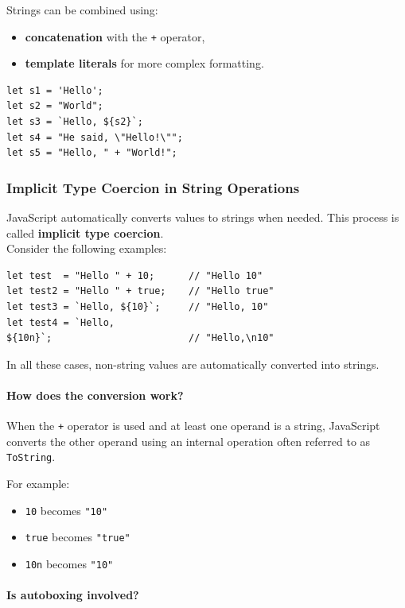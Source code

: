\documentclass{scrbook}
\begin{document}
Strings can be combined using:
\begin{itemize}
    \item \textbf{concatenation} with the \texttt{+} operator,
    \item \textbf{template literals} for more complex formatting.
\end{itemize}

\begin{lstlisting}
let s1 = 'Hello';
let s2 = "World";
let s3 = `Hello, ${s2}`;
let s4 = "He said, \"Hello!\"";
let s5 = "Hello, " + "World!";
\end{lstlisting}

\subsubsection{Implicit Type Coercion in String Operations}

JavaScript automatically converts values to strings when needed. This process is called \textbf{implicit type coercion}.\\

Consider the following examples:

\begin{lstlisting}
let test  = "Hello " + 10;      // "Hello 10"
let test2 = "Hello " + true;    // "Hello true"
let test3 = `Hello, ${10}`;     // "Hello, 10"
let test4 = `Hello,
${10n}`;                        // "Hello,\n10"
\end{lstlisting}

In all these cases, non-string values are automatically converted into strings.

\paragraph{How does the conversion work?}

When the \texttt{+} operator is used and at least one operand is a string, JavaScript converts the other operand using an internal operation often referred to as \texttt{ToString}.

For example:
\begin{itemize}
    \item \texttt{10} becomes \texttt{"10"}
    \item \texttt{true} becomes \texttt{"true"}
    \item \texttt{10n} becomes \texttt{"10"}
\end{itemize}

\paragraph{Is autoboxing involved?}
\end{document}
